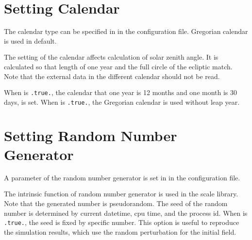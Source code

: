 \section{Setting Calendar} \label{subsec:calendar}

The calendar type can be specified in  in the configuration file.
Gregorian calendar is used in default.


\noindent
The setting of the calendar affects calculation of solar zenith angle.
It is calculated so that length of one year and the full circle of the ecliptic match.
Note that the external data in the different calendar should not be read.

When  is \verb|.true.|,
the calendar that one year is 12 months and one month is 30 days, is set.
%
When  is \verb|.true.|,
the Gregorian calendar is used without leap year.



\section{Setting Random Number Generator} \label{subsec:random}

A parameter of the random number generator is set in  in the configuration file.


\noindent
The intrinsic function of random number generator is used in the scale library. Note that the generated number is pseudorandom.
The seed of the random number is determined by current datetime, cpu time, and the process id.
%
When  is \verb|.true.|, the seed is fixed by specific number.
This option is useful to reproduce the simulation results, which use the random perturbation for the initial field.



